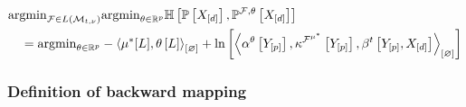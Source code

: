 \begin{align*}
    &\mathrm{argmin}_{\mathcal{F}\in L\left(\mathcal{M}_{t,\nu}\right)}\mathrm{argmin}_{\theta\in\mathbb{R}^{p}}\mathbb{H}\left[\mathbb{P}\left[X_{[d]}\right]
    ,
        \mathbb{P}^{\mathcal{F},\theta}\left[X_{[d]}\right]
    \right] \\
    &\quad= \mathrm{argmin}_{\theta\in\mathbb{R}^{p}}-\left\langle \mu^*[L],\theta\left[L\right]\right\rangle_{\left[ \varnothing \right]} + \ln \left[ \left\langle \alpha^\theta\left[Y_{[p]}\right],\kappa^{\mathcal{F}^{\mu^*}}\left[Y_{[p]}\right],\beta^{t}\left[Y_{[p]},X_{[d]}\right]\right\rangle_{\left[ \varnothing \right]} \right]
\end{align*}

\subsubsection{Definition of backward mapping}
